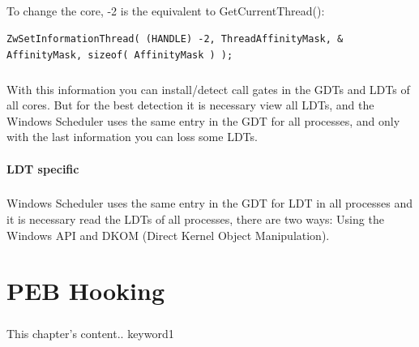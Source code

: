 \documentclass[12pt,a4paper,english]{book}
\newcommand{\keyword}[1]{\index{#1}#1}
\newcommand{\paraph}{\paragraph{}}
\begin{document}
\paraph{}
To change the core, -2 is the equivalent to GetCurrentThread():

\lstset{language=C,caption=Change the affinity from a driver}
\begin{lstlisting}
ZwSetInformationThread( (HANDLE) -2, ThreadAffinityMask, & AffinityMask, sizeof( AffinityMask ) );
\end{lstlisting}

\paraph{}
With this information you can install/detect call gates in the GDTs and LDTs of all cores. But for the best detection it is necessary view all LDTs, and the Windows Scheduler uses the same entry in the GDT for all processes, and only with the last information you can loss some LDTs.

\subsubsection{LDT specific}
\paraph{}
Windows Scheduler uses the same entry in the GDT for LDT in all processes and it is necessary read the LDTs of all processes, there are two ways: Using the Windows API and DKOM (Direct Kernel Object Manipulation).

\chapter{PEB Hooking}
\paraph{}
This chapter's content.. \keyword{keyword1}

\fancyhead[LE,RO]{}
\printbibliography[heading=bibintoc]

\clearpage
{}
\printindex
\end{document}
